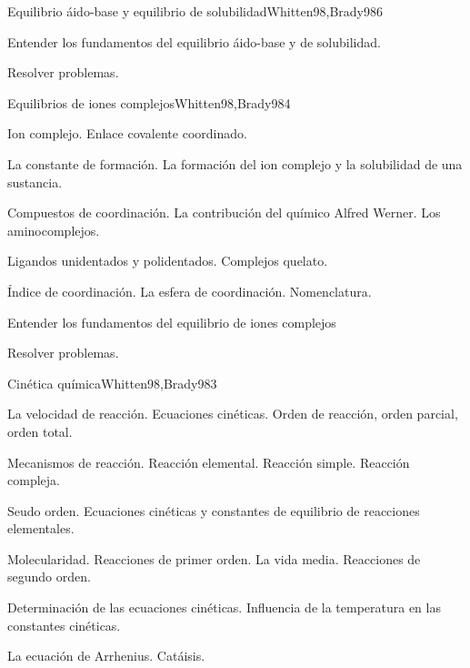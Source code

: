 \begin{syllabus}
\begin{unit}{Equilibrio áido-base y equilibrio de solubilidad}{Whitten98,Brady98}{6}
\begin{learningoutcomes}
	\item Entender los fundamentos del equilibrio áido-base y de solubilidad.
	\item Resolver problemas.
\end{learningoutcomes}
\end{unit}

\begin{unit}{Equilibrios de iones complejos}{Whitten98,Brady98}{4}
\begin{topics}
	\item Ion complejo. Enlace covalente coordinado.
	\item La constante de formación. La formación del ion complejo y la solubilidad de una sustancia.
	\item Compuestos de coordinación. La contribución del químico Alfred Werner. Los aminocomplejos.
	\item Ligandos unidentados y polidentados. Complejos quelato.
	\item Índice de coordinación. La esfera de coordinación. Nomenclatura.
   \end{topics}

   \begin{learningoutcomes}
      \item Entender los fundamentos del equilibrio de iones complejos
      \item Resolver problemas.
   \end{learningoutcomes}
\end{unit}

\begin{unit}{Cinética química}{Whitten98,Brady98}{3}
\begin{topics}
      \item La velocidad de  reacción. Ecuaciones cinéticas. Orden de reacción, orden parcial, orden total.
      \item Mecanismos de reacción. Reacción elemental. Reacción simple. Reacción compleja.
	\item Seudo orden. Ecuaciones cinéticas y constantes de equilibrio de reacciones elementales.
	\item Molecularidad. Reacciones de primer orden. La vida media. Reacciones de segundo orden.
	\item Determinación de las ecuaciones cinéticas. Influencia de la temperatura en las constantes cinéticas.
	\item La ecuación de Arrhenius. Catáisis.
  \end{topics}


\end{unit}
\end{syllabus}
